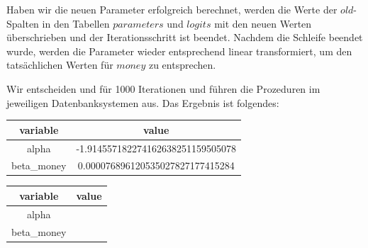 Haben wir die neuen Parameter erfolgreich berechnet, werden die Werte der $old$-Spalten in den Tabellen $parameters$ und $logits$ mit den neuen Werten überschrieben und der Iterationsschritt ist beendet. Nachdem die Schleife beendet wurde, werden die Parameter wieder entsprechend linear transformiert, um den tatsächlichen Werten für $money$ zu entsprechen.

Wir entscheiden und für 1000 Iterationen und führen die Prozeduren im jeweiligen Datenbanksystemen aus. Das Ergebnis ist folgendes:

\begin{center}
  \begin{tabular}{|c|c|}\hline
    \textbf{variable} & \textbf{value} \\ \hline
    alpha & -1.914557182274162638251159505078 \\ \hline
    beta\_money & 0.000076896120535027827177415284 \\ \hline
  \end{tabular}

  \begin{tabular}{|c|c|}\hline
    \textbf{variable} & \textbf{value} \\ \hline
    alpha &  \\ \hline
    beta\_money &  \\ \hline
  \end{tabular}
\end{center}
